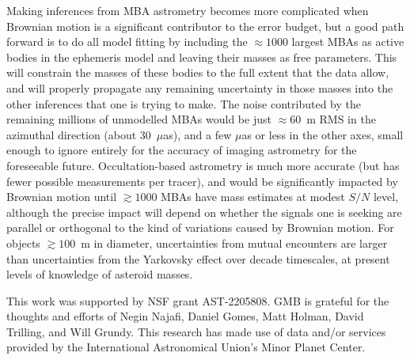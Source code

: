 \documentclass[linenumbers, onecolumn]{aastex631}
\begin{document}
Making inferences from MBA astrometry becomes more complicated when
Brownian motion is a significant contributor to the error budget, but
a good path forward is to do all model fitting by including the
$\approx1000$ largest MBAs as active bodies in the ephemeris model and
leaving their masses as free parameters.  This will constrain the
masses of these bodies to the full extent that the data allow, and
will properly propagate any remaining uncertainty in those masses into
the other inferences that one is trying to make.  The noise
contributed by the remaining millions of unmodelled MBAs would be just
$\approx60$~m RMS in the azimuthal direction (about 30~$\mu$as), and a
few $\mu$as or less in the other axes, small enough to ignore entirely
for the accuracy of imaging astrometry for the foreseeable future.
Occultation-based astrometry is much more accurate (but has fewer possible measurements per tracer), and would be significantly impacted by Brownian motion until $\gtrsim1000$ MBAs have mass estimates at modest $S/N$ level, although the precise impact will depend on whether the signals one is seeking are parallel or orthogonal to the kind of variations caused by Brownian motion.  For objects $\gtrsim100$~m in diameter, uncertainties from mutual encounters are larger than uncertainties from the Yarkovsky effect over decade timescales, at present levels of knowledge of asteroid masses.


\begin{acknowledgments}
  This work was supported by NSF grant AST-2205808.  GMB is grateful for
  the thoughts and efforts of Negin Najafi, Daniel Gomes, Matt Holman,
  David Trilling, and Will Grundy.
  This research has made use of data and/or services provided by the International Astronomical Union's Minor Planet Center. 
\end{acknowledgments}

\newpage


\end{document}
